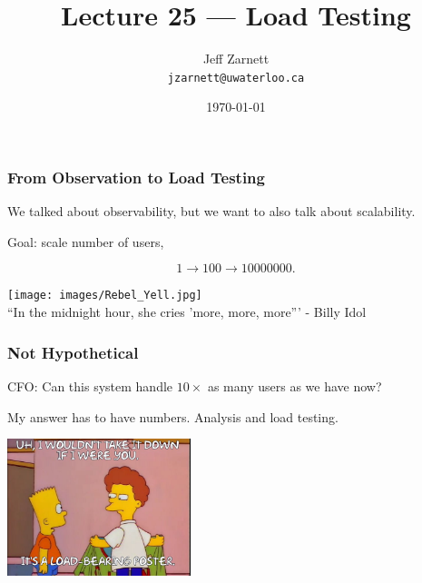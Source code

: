 

\title{Lecture 25 --- Load Testing}

\author{Jeff Zarnett\\ \small \texttt{jzarnett@uwaterloo.ca}}
\date{\today}




\begin{frame}
  \titlepage

\end{frame}

\begin{frame}
\frametitle{From Observation to Load Testing}

We talked about observability, but we want to also talk about scalability.

Goal: scale number of users,

\[ 1 \rightarrow 100 \rightarrow 10 000 000. \]


\begin{center}
	\texttt{[image: images/Rebel\_Yell.jpg]}\\
	\hfill ``In the midnight hour, she cries 'more, more, more''' - Billy Idol
\end{center}

\end{frame}


\begin{frame}
\frametitle{Not Hypothetical}

CFO: Can this system handle $10\times$ as many users as we have now?

My answer has to have numbers. Analysis and \alert{load testing}.

\begin{center}
  \includegraphics[width=0.4\textwidth]{images/loadbearing.jpg}
\end{center}

\end{frame}

